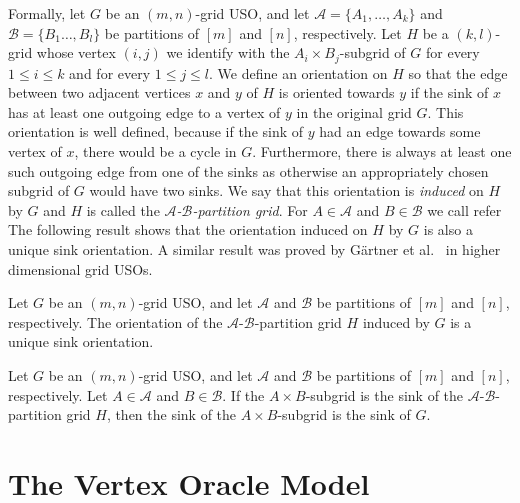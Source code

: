 \documentclass[runningheads,a4paper]{llncs}
\newcommand{\A}{\ensuremath{\mathcal A}}
\newcommand{\B}{\ensuremath{\mathcal B}}
\begin{document}
Formally, let $G$ be an $(m,n)$-grid USO,
and let $\A = \{A_1,\ldots,A_k\}$ and $\B = \{B_1\ldots, B_l\}$ be partitions of $[m]$ and $[n]$, respectively.
Let $H$ be a $(k,l)$-grid whose vertex $(i,j)$ we identify with the $A_i \times B_j$-subgrid of $G$ for every $1\leq i \leq k$ and for every $1 \leq j \leq l$. 
We define an orientation on $H$ so that the edge between two adjacent vertices $x$ and $y$ of $H$ is oriented towards $y$ if the sink of $x$ has at least one outgoing edge to a vertex of $y$ in the original grid $G$. 
This orientation is well defined, because if the sink of $y$ had an edge towards some vertex of $x$, there would be a cycle in $G$. 
Furthermore, there is always at least one such outgoing edge from one of the sinks as otherwise an appropriately chosen subgrid of $G$ would have two sinks. 
We say that this orientation is \emph{induced} on $H$ by $G$ and $H$ is called the \emph{$\A$-$\B$-partition grid}. For $A \in \A$ and $B \in \B$ we call refer 
The following result shows that the orientation induced on $H$ by $G$ is also a unique sink orientation. 
A similar result was proved by G\"artner et al.~\cite{grid08} in higher dimensional grid USOs.




\begin{lemma}\label{lemma:USO-Lemma}
Let $G$ be an $(m,n)$-grid USO,
and let $\A$ and $\B$ be partitions of $[m]$ and $[n]$, respectively.
The orientation of the $\A$-$\B$-partition grid $H$ induced by $G$ is a unique sink orientation.
\end{lemma}

\begin{theorem}
\label{thm:the_sink_of_the_sink_of_the_induced_orientation_is_the_global_sink}

Let $G$ be an $(m,n)$-grid USO,
and let $\A$ and $\B$ be partitions of $[m]$ and $[n]$, respectively. Let $A\in \A$ and $B \in \B$.
If the $A\times B$-subgrid is the sink of the $\A$-$\B$-partition grid $H$, then the sink of the $A\times B$-subgrid is the sink of $G$.
\end{theorem}

\section{The Vertex Oracle Model}
\label{section:The vertex oracle model}
\end{document}
